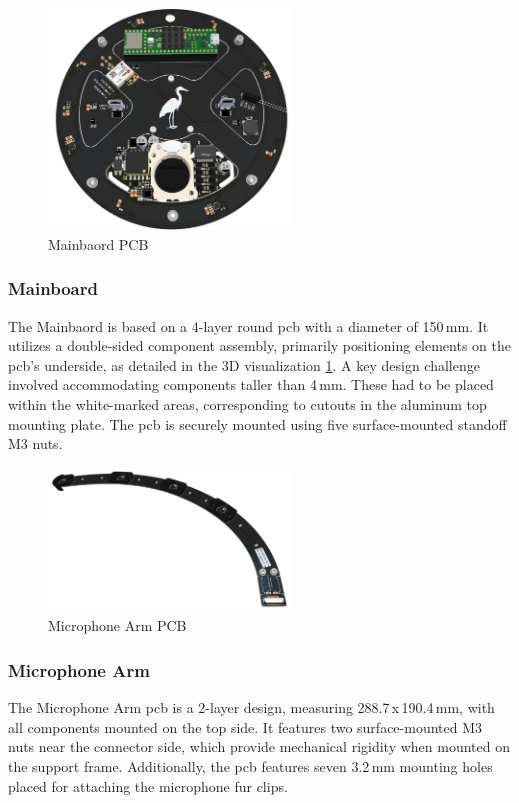 \begin{minipage}{\linewidth}
	\begin{figure}
		\vspace{-0.1cm}
		\includegraphics[width=6.5cm]{images/6_design_final/Mainboard_Back.png}
		\centering
		\caption{Mainbaord PCB}
		\label{fig:mainboard_pcb}
	\end{figure}
	\subsubsection{Mainboard}
	The Mainbaord is based on a 4-layer round \acrshort{pcb} with a diameter of 150\,mm.
	It utilizes a double-sided component assembly, primarily positioning elements on the \acrshort{pcb}'s underside, as detailed in the 3D visualization \ref{fig:mainboard_pcb}.
	A key design challenge involved accommodating components taller than 4\,mm.
	These had to be placed within the white-marked areas, corresponding to cutouts in the aluminum top mounting plate.
	The \acrshort{pcb} is securely mounted using five surface-mounted standoff M3 nuts.
\end{minipage}

\begin{minipage}{\linewidth}
	\begin{figure}
		\vspace{0.2cm}
		\includegraphics[width=6.5cm]{images/6_design_final/Microphone_Arm_Front.png}
		\centering
		\caption{Microphone Arm PCB}
		\label{fig:microphone_arm_pcb}
	\end{figure}
	\subsubsection{Microphone Arm}
	The Microphone Arm \acrshort{pcb} is a 2-layer design, measuring 288.7\,x\,190.4\,mm, with all components mounted on the top side.
	It features two surface-mounted M3 nuts near the connector side, which provide mechanical rigidity when mounted on the support frame.
	Additionally, the \acrshort{pcb} features seven 3.2\,mm mounting holes placed for attaching the microphone fur clips.
\end{minipage}

